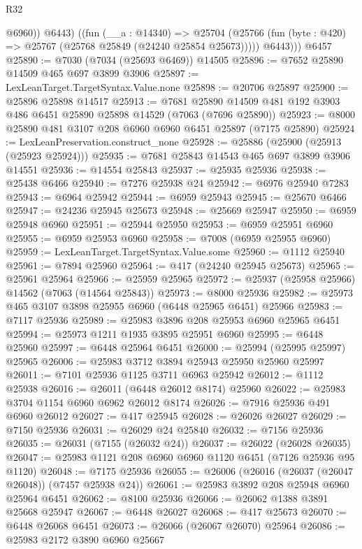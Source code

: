 \begin{lexlean}{R32}
\begin{coremodule}
            @6960))
          @6443)
        ((fun (__a : @14340) =>
        @25704 (@25766 (fun (byte : @420) => @25767 (@25768 @25849 (@24240 @25854 @25673)))))
          @6443)))
    @6457
@25890 := @7030 (@7034 (@25693 @6469)) @14505
@25896 := @7652 @25890 @14509 @465 @697 @3899 @3906
@25897 := LexLeanTarget.TargetSyntax.Value.none
@25898 := @20706 @25897
@25900 := @25896 @25898 @14517
@25913 := @7681 @25890 @14509 @481 @192 @3903 @486 @6451 @25890 @25898 @14529 (@7063 (@7696 @25890))
@25923 := @8000 @25890 @481 @3107 @208 @6960 @6960 @6451 @25897 (@7175 @25890)
@25924 := LexLeanPreservation.construct_none
@25928 := @25886 (@25900 (@25913 (@25923 @25924)))
@25935 := @7681 @25843 @14543 @465 @697 @3899 @3906 @14551
@25936 := @14554 @25843
@25937 := @25935 @25936
@25938 := @25438 @6466
@25940 := @7276 @25938 @24
@25942 := @6976 @25940 @7283
@25943 := @6964 @25942
@25944 := @6959 @25943
@25945 := @25670 @6466
@25947 := @24236 @25945 @25673
@25948 := @25669 @25947
@25950 := @6959 @25948 @6960
@25951 := @25944 @25950
@25953 := @6959 @25951 @6960
@25955 := @6959 @25953 @6960
@25958 := @7008 (@6959 @25955 @6960)
@25959 := LexLeanTarget.TargetSyntax.Value.some
@25960 := @1112 @25940
@25961 := @7894 @25960
@25964 := @417 (@24240 @25945 @25673)
@25965 := @25961 @25964
@25966 := @25959 @25965
@25972 := @25937 (@25958 @25966) @14562 (@7063 (@14564 @25843))
@25973 := @8000 @25936
@25982 := @25973 @465 @3107 @3898 @25955 @6960 (@6448 @25965 @6451) @25966
@25983 := @7117 @25936
@25989 := @25983 @3896 @208 @25953 @6960 @25965 @6451
@25994 := @25973 @1211 @1935 @3895 @25951 @6960
@25995 := @6448 @25960
@25997 := @6448 @25964 @6451
@26000 := @25994 (@25995 @25997) @25965
@26006 := @25983 @3712 @3894 @25943 @25950 @25960 @25997
@26011 := @7101 @25936 @1125 @3711 @6963 @25942
@26012 := @1112 @25938
@26016 := @26011 (@6448 @26012 @8174) @25960
@26022 := @25983 @3704 @1154 @6960 @6962 @26012 @8174
@26026 := @7916 @25936 @491 @6960 @26012
@26027 := @417 @25945
@26028 := @26026 @26027
@26029 := @7150 @25936
@26031 := @26029 @24 @25840
@26032 := @7156 @25936
@26035 := @26031 (@7155 (@26032 @24))
@26037 := @26022 (@26028 @26035)
@26047 := @25983 @1121 @208 @6960 @6960 @1120 @6451 (@7126 @25936 @95 @1120)
@26048 := @7175 @25936
@26055 := @26006 (@26016 (@26037 (@26047 @26048)) (@7457 @25938 @24))
@26061 := @25983 @3892 @208 @25948 @6960 @25964 @6451
@26062 := @8100 @25936
@26066 := @26062 @1388 @3891 @25668 @25947
@26067 := @6448 @26027
@26068 := @417 @25673
@26070 := @6448 @26068 @6451
@26073 := @26066 (@26067 @26070) @25964
@26086 := @25983
    @2172
    @3890
    @6960
    @25667

\end{coremodule}
\end{lexlean}
